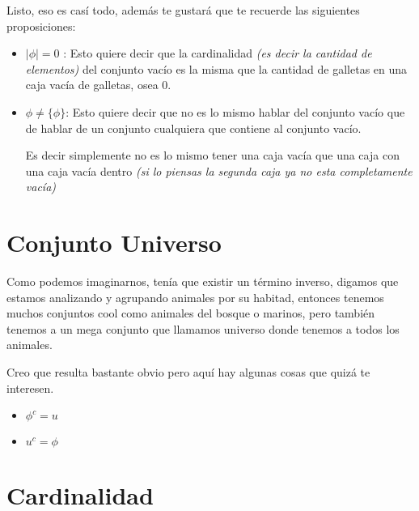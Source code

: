 \documentclass[12pt]{report}                                %
\begin{document}
        Listo, eso es casí todo, además te gustará que te recuerde las siguientes
        proposiciones:

        \begin{itemize}
            \item $|\phi| = 0$ : 
                    Esto quiere decir que la cardinalidad \emph{(es decir
                    la cantidad de elementos)} del conjunto vacío es la misma que 
                    la cantidad de galletas en una caja vacía de galletas, osea 0.

            \item $\phi \neq \{\phi\}$: 
                    Esto quiere decir que no es lo mismo hablar del conjunto
                    vacío que de hablar de un conjunto cualquiera que contiene al
                    conjunto vacío.

                    Es decir simplemente no es lo mismo tener una caja vacía que una caja
                    con una caja vacía dentro \emph{(si lo piensas la segunda caja ya 
                    no esta completamente vacía)}
        \end{itemize}

    \section{Conjunto Universo}
        
        Como podemos imaginarnos, tenía que existir un término inverso, digamos que estamos
        analizando y agrupando animales por su habitad, entonces tenemos muchos conjuntos cool
        como animales del bosque o marinos, pero también tenemos a un mega conjunto que llamamos
        universo donde tenemos a todos los animales.

        Creo que resulta bastante obvio pero aquí hay algunas cosas que quizá te interesen.
        \begin{itemize}
            \item $\phi^c = u$
            \item $u^c = \phi$
        \end{itemize}


    \clearpage
    \section{Cardinalidad}
            
\end{document}
